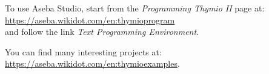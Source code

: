 To use Aseba Studio, start from the \emph{Programming Thymio II} page at:\\
\url{https://aseba.wikidot.com/en:thymioprogram}\\
and follow the link \emph{Text Programming Environment}.

You can find many interesting projects at:\\ \url{https://aseba.wikidot.com/en:thymioexamples}.

\vspace{4em}


